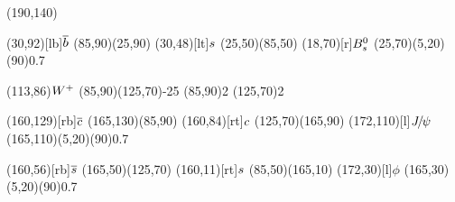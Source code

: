 \documentclass{standalone}
\begin{document}
\begin{axopicture}(190,140)

  \Text(30,92)[lb]{${\overline {{b}}}$}     %
  \Line[arrow](85,90)(25,90)         %
  \Text(30,48)[lt]{${s}$}        %
  \Line[arrow](25,50)(85,50)         %
  \Text(18,70)[r]{${{B}^0_{s}}$}             %
  \GOval(25,70)(5,20)(90){0.7}       %
                                     
  \Text(113,86){\small{${W^+}$}}       %
  \Photon(85,90)(125,70){-2}{5}      %
  \Vertex(85,90){2}                  %
  \Vertex(125,70){2}                 %
                                     
  \Text(160,129)[rb]{${\overline {{c}}}$}   %
  \Line[arrow](165,130)(85,90)       %
  \Text(160,84)[rt]{${c}$}       %
  \Line[arrow](125,70)(165,90)       %
  \Text(172,110)[l]{${{J\mskip -3mu/\mskip -2mu\psi}}$}         %
  \GOval(165,110)(5,20)(90){0.7}     %
                                     
  \Text(160,56)[rb]{${\overline {{s}}}$}    %
  \Line[arrow](165,50)(125,70)       %
  \Text(160,11)[rt]{${s}$}       %
  \Line[arrow](85,50)(165,10)        %
  \Text(172,30)[l]{$\phi$}           %
  \GOval(165,30)(5,20)(90){0.7}      %
                                     
\end{axopicture}
\end{document}
